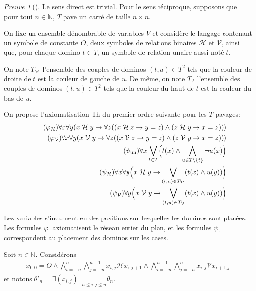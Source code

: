 \documentclass{scrartcl}
\renewcommand{\le}{\leqslant}
\newcommand{\N}{\mathbb N}
\renewcommand{\H}{\mathrel{\mathcal H}}
\newcommand{\V}{\mathrel{\mathcal V}}
\theoremstyle{definition}
\theoremstyle{remark}
\newtheorem*{preuve}{Preuve}
\begin{document}
\begin{preuve}[]
  Le sens direct est trivial. Pour le sens réciproque, supposons que pour tout $n\in\N$, $T$ pave un carré de taille $n\times n$.

  On fixe un ensemble dénombrable de variables $V$ et considère le langage contenant un symbole de constante $O$, deux symboles de relations binaires $\mathcal H$ et $\mathcal V$, ainsi que, pour chaque domino $t\in T$, un symbole de relation unaire aussi noté $t$.
  
  On note $T_{\mathcal H}$ l'ensemble des couples de dominos $(t,u)\in T^2$ tels que la couleur de droite de $t$ est la couleur de gauche de $u$. De même, on note $T_{\mathcal V}$ l'ensemble des couples de dominos $(t,u)\in T^2$ tels que la couleur du haut de $t$ est la couleur du bas de $u$.

  On propose l'axiomatisation $\mathrm{Th}$ du premier ordre suivante pour les $T$-pavages:
  \begin{align}
    \tag{$\varphi_{\mathcal H}$}
    \forall x\forall y (x\H y\rightarrow\forall z((x\H z\rightarrow y=z)\land (z\H y\rightarrow x=z)))\\
    \tag{$\varphi_{\mathcal V}$}
    \forall x\forall y (x\V y\rightarrow\forall z((x\V z\rightarrow y=z) \land (z\V y\rightarrow x=z)))\\
    \tag{$\psi_{\mathrm{un}}$}
    \forall x\bigvee_{t\in T}\Bigl(t(x)\land\bigwedge_{u\in T\setminus\{t\}}\lnot u(x)\Bigr)\\
    \tag{$\psi_{\mathcal H}$}
    \forall x\forall y \Bigl( x\H y \rightarrow \bigvee_{(t,u)\in T_{\mathcal H}}(t(x)\land u(y))\Bigr)\\
    \tag{$\psi_{\mathcal V}$}
    \forall y \Bigl( x\V y \rightarrow \bigvee_{(t,u)\in T_{\mathcal V}}(t(x)\land u(y))\Bigr)
  \end{align}

  Les variables s'incarnent en des positions sur lesquelles les dominos sont placées. Les formules $\varphi_\cdot$ axiomatisent le réseau entier du plan, et les formules $\psi_\cdot$ correspondent au placement des dominos sur les cases.

  Soit $n\in\N$. Considérons
  \begin{align}
    \tag{$\theta_n$}
    x_{0,0}=O\land\bigwedge_{i=-n}^n\bigwedge_{j=-n}^{n-1} x_{i,j}\H x_{i,j+1}\land \bigwedge_{i=-n}^{n-1}\bigwedge_{j=-n}^n x_{i,j}\V x_{i+1,j}
  \end{align}
  et notons $\theta'_n=\exists(x_{i,j})_{-n\le i,j\le n}\theta_n$.


\end{preuve}
\end{document}
